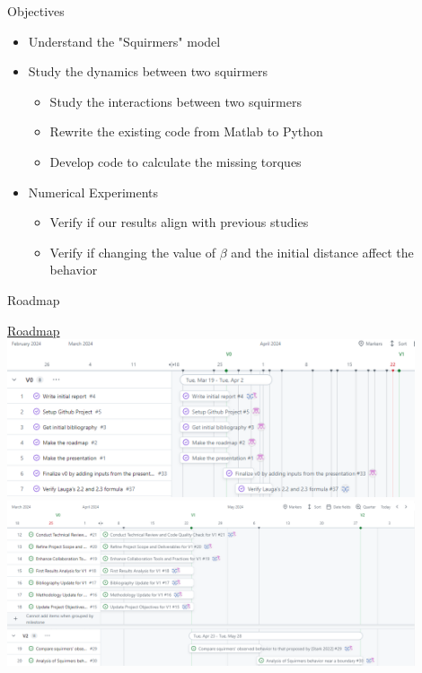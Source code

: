 \documentclass{beamer}
\begin{document}
\begin{frame}{Objectives}
    \begin{itemize}
        \item Understand the "Squirmers" model
        \item Study the dynamics between two squirmers
        \begin{itemize}
            \item Study the interactions between two squirmers \cite{Brumley}\cite{Lauga}
            \item Rewrite the existing code from Matlab to Python
            \item Develop code to calculate the missing torques
        \end{itemize}
        \item Numerical Experiments
        \begin{itemize}
            \item Verify if our results align with previous studies\cite{Brumley}\cite{Lauga}\cite{Stark}
            \item Verify if changing the value of $\beta$ and the initial distance affect the behavior
        \end{itemize}
    \end{itemize}
\end{frame}

\begin{frame}{Roadmap}
    \begin{center}
        \href{https://github.com/orgs/master-csmi/projects/23/views/2}{Roadmap}
        \includegraphics[width=0.9\textwidth]{../images/roadmapV0_1.png}
        \vspace{1em}
        \includegraphics[width=0.9\textwidth]{../images/roadmapV0_2.png}
    \end{center}
\end{frame}
\end{document}

